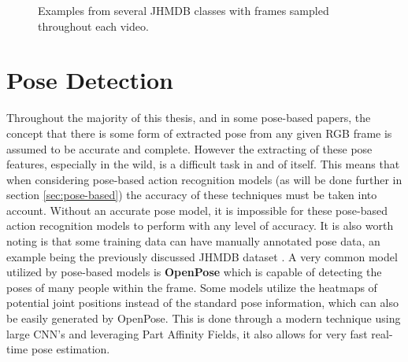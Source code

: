 \begin{figure}[ht]
	\centering
	\caption{Examples from several JHMDB \cite{JHMDB} classes with frames sampled throughout each video.}
	\label{fig:jhmdb-examples}
\end{figure}

\section{Pose Detection}
\label{sec:pose-detection}

Throughout the majority of this thesis, and in some pose-based papers, the concept that there is some form of extracted pose from any given RGB frame is assumed to be accurate and complete. However the extracting of these pose features, especially in the wild, is a difficult task in and of itself. This means that when considering pose-based action recognition models (as will be done further in section \ref{sec:pose-based}) the accuracy of these techniques must be taken into account. Without an accurate pose model, it is impossible for these pose-based action recognition models to perform with any level of accuracy. It is also worth noting is that some training data can have manually annotated pose data, an example being the previously discussed JHMDB dataset \cite{JHMDB}. A very common model utilized by pose-based models is \textbf{OpenPose} \cite{openpose} which is capable of detecting the poses of many people within the frame. Some models utilize the heatmaps of potential joint positions instead of the standard pose information, which can also be easily generated by OpenPose. This is done through a modern technique using large CNN's and leveraging Part Affinity Fields, it also allows for very fast real-time pose estimation.

